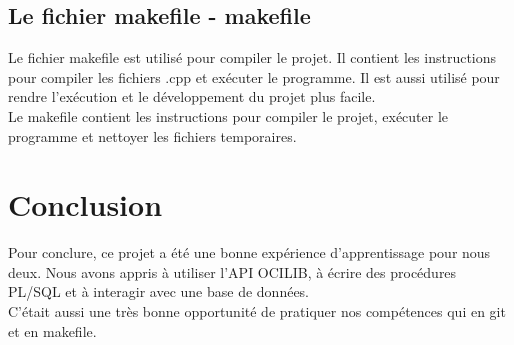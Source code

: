 \documentclass[a4paper,12pt]{article}
\begin{document}
\subsection{Le fichier makefile - makefile}
Le fichier makefile est utilisé pour compiler le projet. Il contient les instructions pour compiler les fichiers .cpp et exécuter le programme.
Il est aussi utilisé pour rendre l'exécution et le développement du projet plus facile. \\
\indent Le makefile contient les instructions pour compiler le projet, exécuter le programme et nettoyer les fichiers temporaires.

\section{Conclusion}
Pour conclure, ce projet a été une bonne expérience d'apprentissage pour nous deux. Nous avons appris à utiliser l'API OCILIB, à écrire des procédures PL/SQL et à
interagir avec une base de données. \\
\indent C'était aussi une très bonne opportunité de pratiquer nos compétences qui en git et en makefile.
\end{document}
